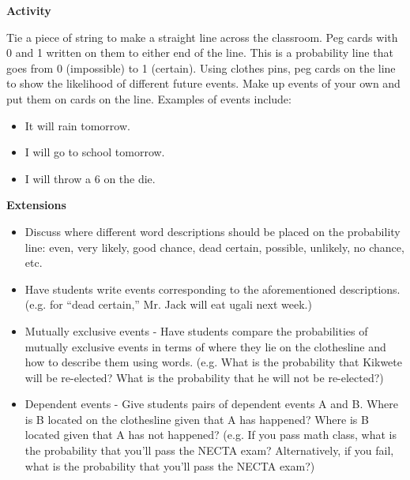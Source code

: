 		\noindent \textbf{Activity}
		
		\noindent Tie a piece of string to make a straight line across the classroom. Peg cards with 0 and 1 written on them to either end of the line. This is a probability line that goes from 0 (impossible) to 1 (certain). Using clothes pins, peg cards on the line to show the likelihood of different future events. Make up events of your own and put them on cards on the line. Examples of events include:
		\begin{itemize}
		\item It will rain tomorrow.
		\item I will go to school tomorrow.
		\item I will throw a 6 on the die.
		\end{itemize}	
					
		\noindent \textbf{Extensions}

\begin{itemize}
\item Discuss where different word descriptions should be placed on the probability line: even, very likely, good chance, dead certain, possible, unlikely, no chance, etc.
\item Have students write events corresponding to the aforementioned descriptions. (e.g. for ``dead certain,'' Mr. Jack will eat ugali next week.)
\item Mutually exclusive events - Have students compare the probabilities of mutually exclusive events in terms of where they lie on the clothesline and how to describe them using words. (e.g. What is the probability that Kikwete will be re-elected? What is the probability that he will not be re-elected?)
\item Dependent events - Give students pairs of dependent events A and B. Where is B located on the clothesline given that A has happened? Where is B located given that A has not happened? (e.g. If you pass math class, what is the probability that you'll pass the NECTA exam? Alternatively, if you fail, what is the probability that you'll pass the NECTA exam?)
\end{itemize}
		
